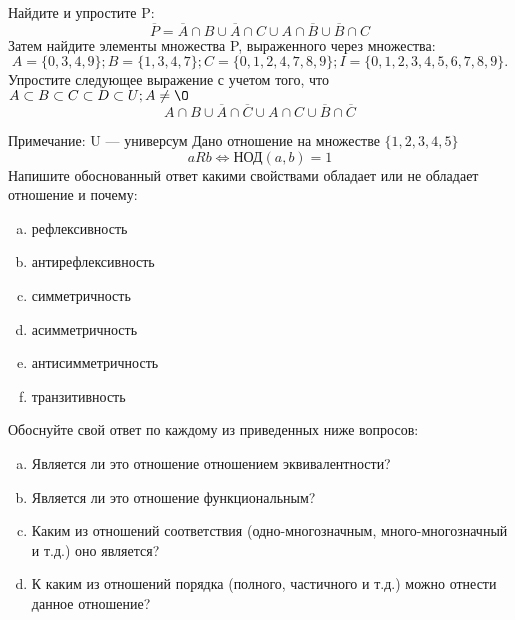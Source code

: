 \documentclass[10pt]{exam}
\begin{document}
\begin{questions}
\question
Найдите и упростите P:
\begin{equation*}
\overline{P} = \overline{A} \cap B \cup \overline{A} \cap C \cup A \cap \overline{B} \cup \overline{B} \cap C
\end{equation*}
Затем найдите элементы множества P, выраженного через множества:
\begin{equation*}
A = \{0, 3, 4, 9\}; 
B = \{1, 3, 4, 7\};
C = \{0, 1, 2, 4, 7, 8, 9\};
I = \{0, 1, 2, 3, 4, 5, 6, 7, 8, 9\}.
\end{equation*}\question
Упростите следующее выражение с учетом того, что $A\subset B \subset C \subset D \subset U; A \neq \O$
\begin{equation*}
A \cap B \cup \overline{A} \cap \overline{C} \cup A \cap C \cup \overline{B} \cap \overline{C}
\end{equation*}

Примечание: U — универсум\question
Дано отношение на множестве $\{1, 2, 3, 4, 5\}$ 
\begin{equation*}
aRb \iff  \text{НОД}(a,b) =1
\end{equation*}
Напишите обоснованный ответ какими свойствами обладает или не обладает отношение и почему:   
\begin{enumerate} [a)]\setcounter{enumi}{0}
\item рефлексивность
\item антирефлексивность
\item симметричность
\item асимметричность
\item антисимметричность
\item транзитивность
\end{enumerate}

Обоснуйте свой ответ по каждому из приведенных ниже вопросов:
\begin{enumerate} [a)]\setcounter{enumi}{0}
    \item Является ли это отношение отношением эквивалентности?
    \item Является ли это отношение функциональным?
    \item Каким из отношений соответствия (одно-многозначным, много-многозначный и т.д.) оно является?
    \item К каким из отношений порядка (полного, частичного и т.д.) можно отнести данное отношение?
\end{enumerate}



\end{questions}
\end{document}
